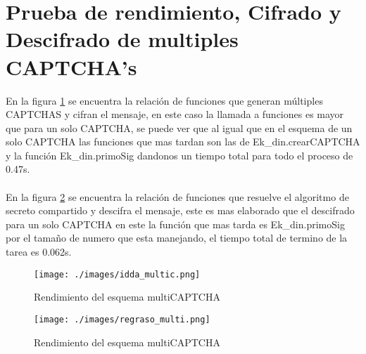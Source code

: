 \section{Prueba de rendimiento, Cifrado y Descifrado de multiples CAPTCHA's}
En la figura \ref{fig:7-3} se encuentra la relación de funciones que generan múltiples CAPTCHAS y cifran el mensaje, en este caso la llamada a funciones es mayor que para un solo CAPTCHA, se puede ver que al igual que en el esquema de un solo CAPTCHA las funciones que mas tardan son las de Ek\_din.crearCAPTCHA  y la función Ek\_din.primoSig dandonos un tiempo total para todo el proceso de 0.47s.\\\\
En la figura \ref{fig:7-4} se encuentra la relación de funciones que resuelve el algoritmo de secreto compartido y descifra el mensaje, este es mas elaborado que el descifrado para un solo CAPTCHA en este la función que mas tarda es Ek\_din.primoSig por el tamaño de numero que esta manejando, el tiempo total de termino de la tarea es 0.062s.
\begin{figure}[H]
 \raggedright
 \texttt{[image: ./images/idda\_multic.png]}
		\caption{Rendimiento del esquema multiCAPTCHA}
		\label{fig:7-3}
\end{figure}
\begin{figure}[H]
 \raggedright
 \texttt{[image: ./images/regraso\_multi.png]}
		\caption{Rendimiento del esquema multiCAPTCHA}
		\label{fig:7-4}
\end{figure}